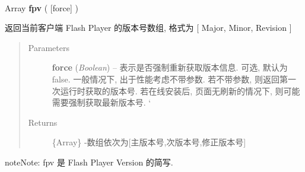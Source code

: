 \documentclass[letterpaper,10pt,english]{sphinxmanual}
\begin{document}
\begin{fulllineitems}
\label{api/component/flash/flash-ua:flash.fpv}~
\begin{DUlineblock}{0em}
\item[] Array \textbf{fpv} ( {[}force{]} )
\item[] 返回当前客户端 Flash Player 的版本号数组, 格式为 {[} Major, Minor, Revision {]}
\end{DUlineblock}
\begin{quote}\begin{description}
\item[{Parameters}] \leavevmode
\textbf{force} (\emph{Boolean}) -- 表示是否强制重新获取版本信息. 可选, 默认为false. 一般情况下, 出于性能考虑不带参数.     若不带参数, 则返回第一次运行时获取的版本号. 若在线安装后, 页面无刷新的情况下, 则可能需要强制获取最新版本号. {}`

\item[{Returns}] \leavevmode
\{Array\} -数组依次为{[}主版本号,次版本号,修正版本号{]}

\end{description}\end{quote}

\begin{notice}{note}{Note:}
fpv 是 Flash Player Version 的简写.
\end{notice}

\end{fulllineitems}


\end{document}
